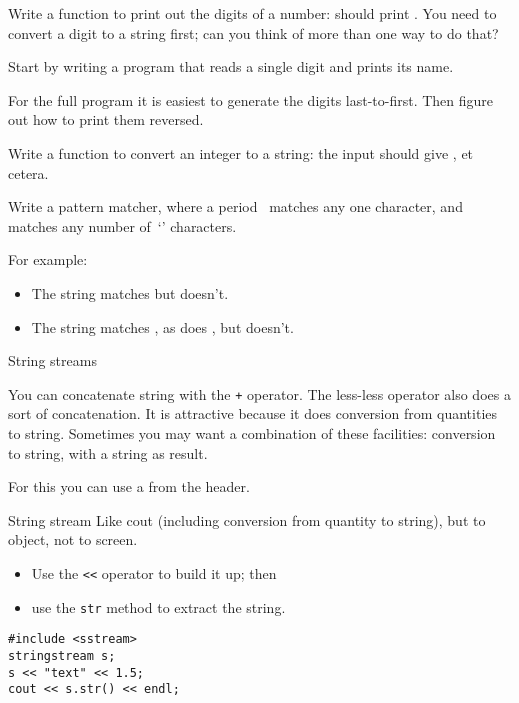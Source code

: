 \begin{exercise}
  \label{ex:printdigits}
  Write a function to print out the digits of a number:  should
  print .
  You need to convert a digit to a string first; can you think of more
  than one way to do that?

  Start by writing a program that reads a single digit and prints its name.

  For the full program it is easiest to generate the  digits last-to-first.
  Then figure out how to print them reversed.
\end{exercise}

\begin{exercise}
  \label{ex:printnumber}
  Write a function to convert an integer to a string: the input
   should give , et cetera.
\end{exercise}

\begin{exercise}
  Write a pattern matcher, where a period~ matches any one
  character, and  matches any number of~`' characters.

  For example:
  \begin{itemize}
  \item The string  matches  but  doesn't.
  \item The string  matches , as does , but
     doesn't.
  \end{itemize}
\end{exercise}

 {String streams}
\label{sec:stringstream}

You can concatenate string with the \lstinline{+} operator.
The less-less operator also does a sort of concatenation. It is
attractive because it does conversion from quantities to string.
Sometimes you may want a combination of these facilities: conversion
to string, with a string as result.

For this you can use a 
from the  header.

\begin{block}{String stream}
  \label{sl:sstream}
  Like cout (including conversion from quantity to string), but to
  object, not to screen.
\begin{itemize}
\item Use the \lstinline{<<} operator to build it up; then
\item use the \lstinline{str} method to extract the string.
\end{itemize}
  \lstset{style=snippetcode}
\begin{lstlisting}
#include <sstream>
stringstream s;
s << "text" << 1.5;
cout << s.str() << endl;
\end{lstlisting}
\end{block}

